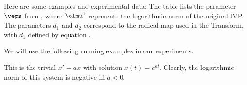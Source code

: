 {%

    Here are some examples and experimental data:
	The table lists the parameter $\veps$ from \stepa, where $\olmu^1$
	represents the logarithmic norm of the original IVP. The parameters
	$d_1$ and $d_2$ correspond to the radical map used in the Transform,
	with $d_1$ defined by equation .  

    We will use the following running examples in our experiments:

		\begin{Example}[ 0.]
            This is the trivial $x'=ax$ with solution $x(t)=e^{at}$.
            Clearly, the logarithmic norm of this system is
            negative iff $a<0$.
        \end{Example}

}
